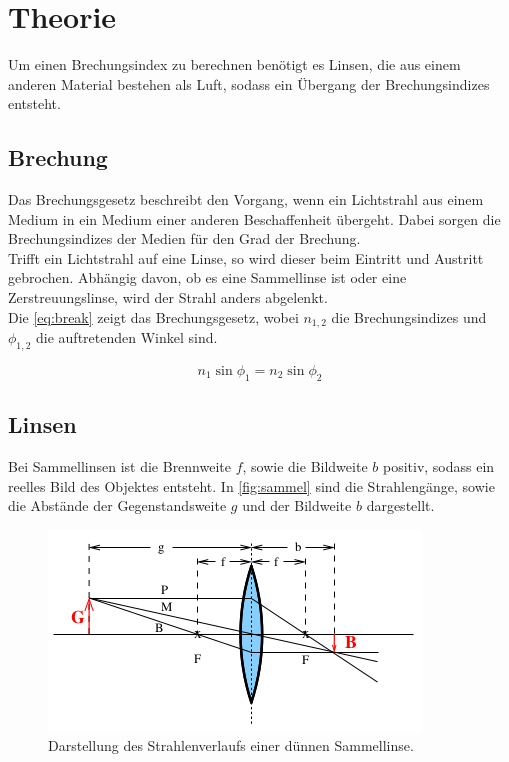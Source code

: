 \section{Theorie}
\label{sec:Theorie}

Um einen Brechungsindex zu berechnen benötigt es Linsen, die aus einem anderen Material bestehen als Luft, sodass ein Übergang der Brechungsindizes entsteht.
\subsection{Brechung}
Das Brechungsgesetz beschreibt den Vorgang, wenn ein Lichtstrahl aus einem Medium in ein Medium einer anderen Beschaffenheit übergeht.
Dabei sorgen die Brechungsindizes der Medien für den Grad der Brechung.\\
Trifft ein Lichtstrahl auf eine Linse, so wird dieser beim Eintritt und Austritt gebrochen.
Abhängig davon, ob es eine Sammellinse ist oder eine Zerstreuungslinse, wird der Strahl anders abgelenkt.\\
Die \autoref{eq:break} zeigt das Brechungsgesetz, wobei $n_{1,2}$ die Brechungsindizes und $\phi_{1,2}$ die auftretenden Winkel sind.

\begin{equation}
    n_1 \sin{\phi_1} = n_2 \sin{\phi_2}
    \label{eq:break}
\end{equation}

\subsection{Linsen}
Bei Sammellinsen ist die Brennweite $f$, sowie die Bildweite $b$ positiv, sodass ein reelles Bild des Objektes entsteht.
In \autoref{fig:sammel} sind die Strahlengänge, sowie die Abstände der Gegenstandsweite $g$ und der Bildweite $b$ dargestellt.

\begin{figure}[htbp]
    \centering
    \includegraphics[scale=0.5]{Data/Sammeldia.png}
    \caption{Darstellung des Strahlenverlaufs einer dünnen Sammellinse.}
    \label{fig:sammel}
\end{figure}

